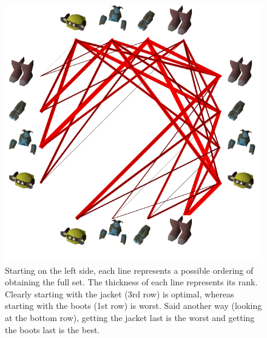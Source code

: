 \begin{figure}
	\centering
	\includegraphics[width=0.5\linewidth]{img/mining/optimal_order.pdf}
	\caption{
		Starting on the left side, each line represents a possible ordering of obtaining the full set. The thickness of each line represents its rank. Clearly starting with the jacket (3rd row) is optimal, whereas starting with the boots (1st row) is worst. Said another way (looking at the bottom row), getting the jacket last is the worst and getting the boots last is the best.
	}
	\label{fig:mining_order}
\end{figure}



